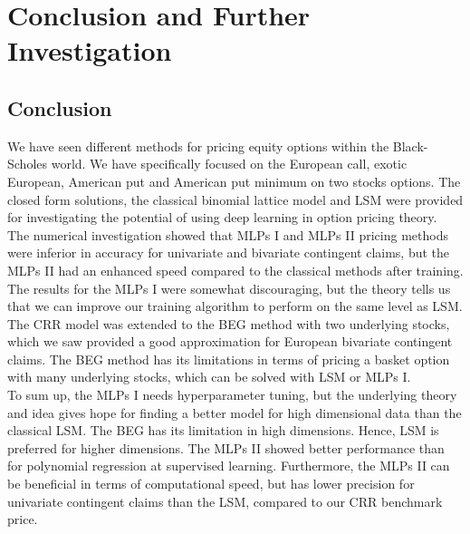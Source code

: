 
\chapter{Conclusion and Further Investigation} %

\label{Chapter7} %


\section{Conclusion}
We have seen different methods for pricing equity options within the Black-Scholes world. We have specifically focused on the European call, exotic European, American put and American put minimum on two stocks options. The closed form solutions, the classical binomial lattice model and LSM were provided for investigating the potential of using deep learning in option pricing theory. \\

The numerical investigation showed that MLPs I and MLPs II pricing methods were inferior in accuracy for univariate and bivariate contingent claims, but the MLPs II had an enhanced speed compared to the classical methods after training. The results for the MLPs I were somewhat discouraging, but the theory tells us that we can improve our training algorithm to perform on the same level as LSM. The CRR model was extended to the BEG method with two underlying stocks, which we saw provided a good approximation for European bivariate contingent claims. The BEG method has its limitations in terms of pricing a basket option with many underlying stocks, which can be solved with LSM or MLPs I.\\

To sum up, the MLPs I needs hyperparameter tuning, but the underlying theory and idea gives hope for finding a better model for high dimensional data than the classical LSM. The BEG has its limitation in high dimensions. Hence, LSM is preferred for higher dimensions. The MLPs II showed better performance than for polynomial regression at supervised learning. Furthermore, the MLPs II can be beneficial in terms of computational speed, but has lower precision for univariate contingent claims than the LSM, compared to our CRR benchmark price.\\

